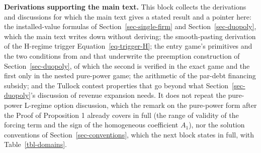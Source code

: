 \documentclass[
  11pt,
  letterpaper,
]{scrartcl}
\begin{document}
\textbf{Derivations supporting the main text.} This block collects the
derivations and discussions for which the main text gives a stated
result and a pointer here: the installed-value formulas of
Section~\ref{sec-single-firm} and Section~\ref{sec-duopoly}, which the
main text writes down without deriving; the smooth-pasting derivation of
the H-regime trigger Equation~\ref{eq-trigger-H}; the entry game's
primitives and the two conditions from \citet{huisman2015strategic} and
\citet{pawlina2006real} that underwrite the preemption construction of
Section~\ref{sec-duopoly}, of which the second is verified in the exact
game and the first only in the nested pure-power game; the arithmetic of
the par-debt financing subsidy; and the Tullock contest properties that
go beyond what Section~\ref{sec-duopoly}'s discussion of revenue
expansion needs. It does not repeat the pure-power L-regime option
discussion, which the remark on the pure-power form after the Proof of
Proposition 1 already covers in full (the range of validity of the
forcing term and the sign of the homogeneous coefficient \(A_1\)), nor
the solution conventions of Section~\ref{sec-conventions}, which the
next block states in full, with Table~\ref{tbl-domains}.
\end{document}
